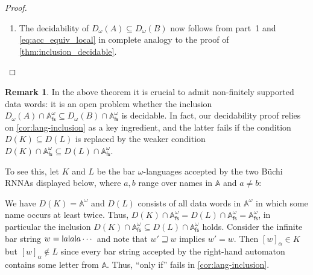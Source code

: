 \documentclass[10pt,a4paper]{amsart}
\newcommand{\midmid}{\hspace{0.2ex}{\rule[-0.1ex]{0.6pt}{1.65ex}}\hspace{0.2ex}}
\newcommand{\newletter}[1]{{\midmid}#1}
\numberwithin{equation}{section}
\newcommand{\seq}{\subseteq}
\newcommand{\fs}{\mathsf{fs}}
\newcommand{\+}[1]{\mathcal{#1}\xspace}
\newcommand{\names}{\mathbb{A}}
\theoremstyle{definition}
\newtheorem{rem}[theorem]{Remark}
\begin{document}
\begin{proof}
\begin{enumerate}
  \item The decidability of $D_\omega(A)\seq D_\omega(B)$ now follows
    from part~1 and \eqref{eq:acc_equiv_local} in complete analogy to the proof
    of \autoref{thm:inclusion_decidable}.  \qedhere
  \end{enumerate}
\end{proof}
%
\begin{rem}\label{rem:data-language-finite-support}
  In the above theorem it is crucial to admit non-finitely supported
  data words: it is an open problem whether the inclusion
  $D_\omega(A)\cap \names^\omega_\fs\seq D_\omega(B)\cap
  \names^\omega_\fs$ is decidable. In fact, our decidability proof
  relies on \autoref{cor:lang-inclusion} as a key ingredient, and the
  latter fails if the condition $D(K)\seq D(L)$ is replaced by the
  weaker condition
  $D(K)\cap \names^\omega_\fs \seq D(L)\cap \names^\omega_\fs$.

  To see this, let $K$ and $L$ be the bar $\omega$-languages accepted
  by the two Büchi RNNAs displayed below, where $a,b$ range over names
  in $\names$ and $a\neq b$:
  \begin{center}
    \qquad\qquad\qquad
  \end{center}
  We have $D(K)=\names^\omega$ and $D(L)$ consists of all data words
  in $\names^\omega$ in which some name occurs at least twice. Thus,
  $D(K)\cap \names^\omega_\fs = D(L)\cap \names^\omega_\fs =
  \names^\omega_\fs$, in particular the inclusion
  $D(K)\cap \names^\omega_\fs \seq D(L)\cap \names^\omega_\fs$
  holds. Consider the infinite bar string
  $w=\newletter a\newletter a\newletter a\cdots$ and note that
  $w'\sqsupseteq w$ implies $w'=w$. Then $[w]_\alpha \in K$ but
  $[w]_\alpha\not\in L$ since every bar string accepted by the
  right-hand automaton contains some letter from $\names$. 
  Thus, ``only if'' fails in \autoref{cor:lang-inclusion}.
\end{rem}
%
\end{document}
